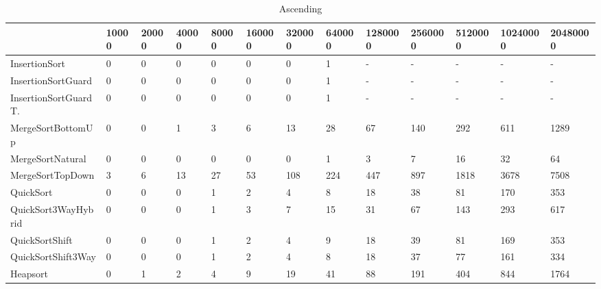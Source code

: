 \begin{table}[h]
\begin{tabular}{|l|l|l|l|l|l|l|l|l|l|l|l|l|}
\hline
 & 10000 & 20000 & 40000 & 80000 & 160000 & 320000 & 640000 & 1280000 & 2560000 & 5120000 & 10240000 & 20480000 \\ \hline
InsertionSort & 0 & 0 & 0 & 0 & 0 & 0 & 1 & - & - & - & - & - \\ \hline
InsertionSortGuard & 0 & 0 & 0 & 0 & 0 & 0 & 1 & - & - & - & - & - \\ \hline
InsertionSortGuardT. & 0 & 0 & 0 & 0 & 0 & 0 & 1 & - & - & - & - & - \\ \hline
MergeSortBottomUp & 0 & 0 & 1 & 3 & 6 & 13 & 28 & 67 & 140 & 292 & 611 & 1289 \\ \hline
MergeSortNatural & 0 & 0 & 0 & 0 & 0 & 0 & 1 & 3 & 7 & 16 & 32 & 64 \\ \hline
MergeSortTopDown & 3 & 6 & 13 & 27 & 53 & 108 & 224 & 447 & 897 & 1818 & 3678 & 7508 \\ \hline
QuickSort & 0 & 0 & 0 & 1 & 2 & 4 & 8 & 18 & 38 & 81 & 170 & 353 \\ \hline
QuickSort3WayHybrid & 0 & 0 & 0 & 1 & 3 & 7 & 15 & 31 & 67 & 143 & 293 & 617 \\ \hline
QuickSortShift & 0 & 0 & 0 & 1 & 2 & 4 & 9 & 18 & 39 & 81 & 169 & 353 \\ \hline
QuickSortShift3Way & 0 & 0 & 0 & 1 & 2 & 4 & 8 & 18 & 37 & 77 & 161 & 334 \\ \hline
Heapsort & 0 & 1 & 2 & 4 & 9 & 19 & 41 & 88 & 191 & 404 & 844 & 1764 \\ \hline
\end{tabular}
\caption{Ascending}
\end{table}
